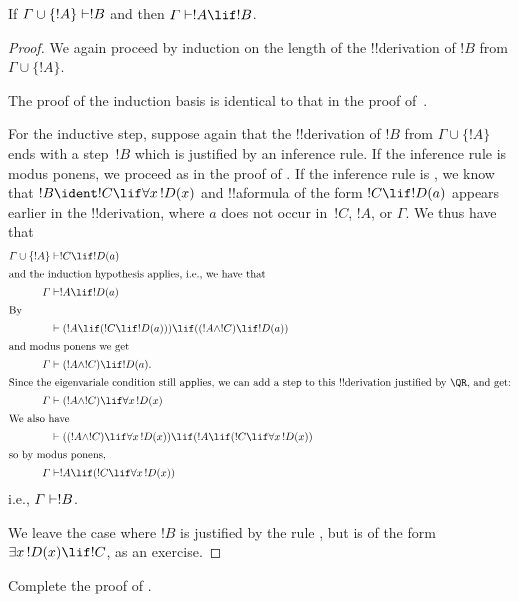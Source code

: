 \documentclass[../../../include/open-logic-section]{subfiles}
\begin{document}


\begin{thm}
 If $\Gamma \cup \{!A\} \Proves !B$ and
then $\Gamma \Proves !A \lif !B$.
\end{thm}

\begin{proof}
We again proceed by induction on the length
of the !!{derivation} of $!B$ from $\Gamma \cup \{!A\}$.

The proof of the induction basis is identical to that in the proof
of~.

For the inductive step, suppose again that the !!{derivation} of $!B$
from $\Gamma \cup \{!A\}$ ends with a step~$!B$ which is justified by
an inference rule. If the inference rule is modus ponens, we proceed
as in the proof of . If the inference
rule is \QR, we know that $!B \ident !C \lif \lforall[x][!D(x)]$ and
!!a{formula} of the form $!C \lif !D(a)$ appears earlier in the
!!{derivation}, where $a$ does not occur in~$!C$, $!A$, or $\Gamma$. We
thus have that
\begin{align*}
  \Gamma \cup \{!A\} & \Proves !C \lif !D(a)\\
  \intertext{and the induction hypothesis applies, i.e., we have that}
  \Gamma & \Proves !A \lif !D(a)\\
  \intertext{By}
  & \Proves (!A \lif (!C \lif !D(a))) \lif ((!A \land !C) \lif !D(a))\\
  \intertext{and modus ponens we get}
  \Gamma & \Proves (!A \land !C) \lif !D(a).\\
  \intertext{Since the eigenvariale condition still applies, we can add a step to this !!{derivation} justified by \QR, and get:}
    \Gamma & \Proves (!A \land !C) \lif \lforall[x][!D(x)]\\
    \intertext{We also have}
    & \Proves ((!A \land !C) \lif \lforall[x][!D(x)]) \lif (!A \lif (!C \lif \lforall[x][!D(x)])\\
    \intertext{so by modus ponens,}
    \Gamma & \Proves !A \lif (!C \lif \lforall[x][!D(x)])
\end{align*}
i.e., $\Gamma \Proves !B$.

We leave the case where $!B$ is justified by the rule \QR, but is of
the form $\lexists[x][!D(x)] \lif !C$, as an exercise.
\end{proof}

\begin{prob}
  Complete the proof of .
\end{prob}
\end{document}
